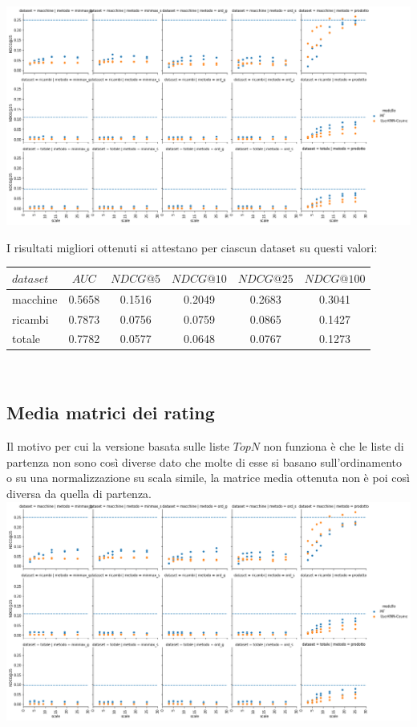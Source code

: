\includegraphics[width=16cm]{figures/comb_1.png}

I risultati migliori ottenuti si attestano per ciascun dataset su questi valori:\\

\begin{tabular}{|l|ccccc|}
    \toprule
    $dataset$ & $AUC$ & $NDCG@5$ & $NDCG@10$  & $NDCG@25$ & $NDCG@100$  \\
    \midrule
    macchine & 0.5658   &0.1516 & 0.2049 & 0.2683 & 0.3041 \\
    ricambi &  0.7873  &0.0756 & 0.0759 & 0.0865 & 0.1427 \\
    totale  & 0.7782   &0.0577 & 0.0648 & 0.0767 & 0.1273 \\
\bottomrule
\end{tabular}\\


\subsection{Media matrici dei rating}
Il motivo per cui la versione basata sulle liste $TopN$ non funziona è che le liste di partenza non sono così diverse dato che molte di esse si basano sull'ordinamento o su una normalizzazione su scala simile, la matrice media ottenuta non è poi così diversa da quella di partenza.\\

\includegraphics[width=16cm]{figures/comb_2.png}

